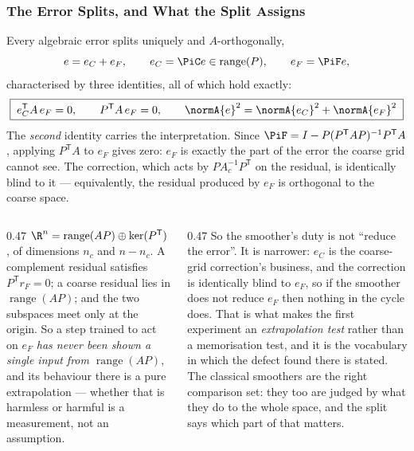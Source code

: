 \frametitle{The Error Splits, and What the Split Assigns}
\footnotesize

Every algebraic error splits uniquely and $A$-orthogonally,
\[
e=e_C+e_F,\qquad e_C=\PiC e\in\operatorname{range}(P),\qquad e_F=\PiF e ,
\]
characterised by three identities, all of which hold exactly:
\[
\boxed{\;e_C^{\mathsf T}A\,e_F=0,\qquad P^{\mathsf T}A\,e_F=0,\qquad
\normA{e}^2=\normA{e_C}^2+\normA{e_F}^2\;}
\]
The \emph{second} identity carries the interpretation. Since
$\PiF=I-P(P^{\mathsf T}AP)^{-1}P^{\mathsf T}A$, applying $P^{\mathsf T}A$ to $e_F$ gives
zero: $e_F$ is exactly the part of the error the coarse grid \alert{cannot see}. The
correction, which acts by $PA_c^{-1}P^{\mathsf T}$ on the residual, is identically blind to
it --- equivalently, the residual produced by $e_F$ is orthogonal to the coarse space.

\begin{columns}[T]
\begin{column}{0.47\textwidth}
$\R^n=\operatorname{range}(AP)\oplus\ker(P^{\mathsf T})$, of dimensions $n_c$ and
$n-n_c$. A complement residual satisfies $P^{\mathsf T}r_F=0$; a coarse residual lies in
$\operatorname{range}(AP)$; and the two subspaces meet only at the origin. So a step trained
to act on $e_F$ \emph{has never been shown a single input from
$\operatorname{range}(AP)$}, and its behaviour there is a pure extrapolation --- whether
that is harmless or harmful is a measurement, not an assumption.
\end{column}
\begin{column}{0.47\textwidth}
So the smoother's duty is not ``reduce the error''. It is narrower: $e_C$ is the
coarse-grid correction's business, and the correction is identically blind to $e_F$, so
\alert{if the smoother does not reduce $e_F$ then nothing in the cycle does}. That is what
makes the first experiment an \emph{extrapolation test} rather than a memorisation test,
and it is the vocabulary in which the defect found there is stated. The classical
smoothers are the right comparison set: they too are judged by what they do to the whole
space, and the split says which part of that matters.
\end{column}
\end{columns}
